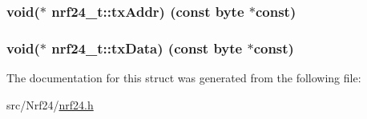 \subsubsection[{tx\+Addr}]{\setlength{\rightskip}{0pt plus 5cm}void($\ast$ nrf24\+\_\+t\+::tx\+Addr) (const {\bf byte} $\ast$const)}\label{structnrf24__t_abfc805d8cb41f8a3bf611a76a5d830db}
\hypertarget{structnrf24__t_a1dbfdf83bc96820d8a24cb7a34f58ef8}{}
\subsubsection[{tx\+Data}]{\setlength{\rightskip}{0pt plus 5cm}void($\ast$ nrf24\+\_\+t\+::tx\+Data) (const {\bf byte} $\ast$const)}\label{structnrf24__t_a1dbfdf83bc96820d8a24cb7a34f58ef8}


The documentation for this struct was generated from the following file\+:\begin{DoxyCompactItemize}
\item 
src/\+Nrf24/\hyperlink{nrf24_8h}{nrf24.\+h}\end{DoxyCompactItemize}
